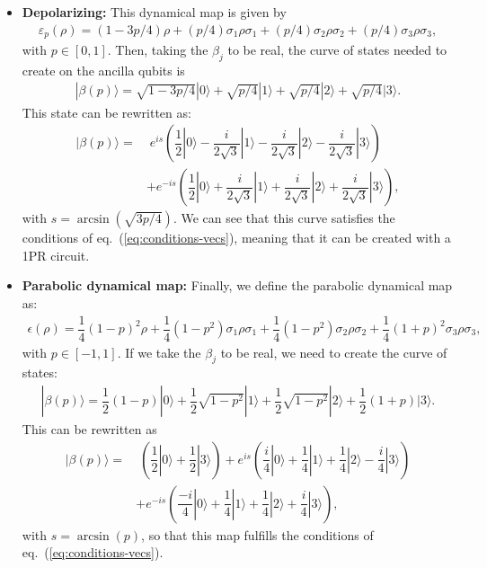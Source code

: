 \documentclass[10pt,letterpaper]{article} %
\newcommand{\eref}[1]{eq.~(\ref{#1})}
\begin{document}
\begin{itemize}
\item \textbf{Depolarizing:} This dynamical map is given by
\begin{align*}
\varepsilon_p(\rho) = (1-3p/4) \rho + (p/4) \sigma_1 \rho \sigma_1 + (p/4) \sigma_2 \rho \sigma_2 + (p/4) \sigma_3 \rho \sigma_3,
\end{align*}
with $p \in [0,1]$. 
Then, taking the $\beta_j$ to be real,
the curve of states needed to create on the ancilla qubits is
\begin{align*}
|\beta(p) \rangle = \sqrt{1-3p/4} |0\rangle + \sqrt{p/4} |1\rangle + \sqrt{p/4} |2 \rangle  + \sqrt{p/4} |3\rangle.
\end{align*}
This state can be rewritten as:
\begin{align*}
|\beta(p)\rangle =& \; e^{is} \left( \dfrac{1}{2} |0\rangle - \dfrac{i}{2\sqrt{3}} |1\rangle - \dfrac{i}{2\sqrt{3}} |2 \rangle - \dfrac{i}{2\sqrt{3}} |3\rangle \right) \\
& + e^{-is} \left( \dfrac{1}{2} |0\rangle + \dfrac{i}{2\sqrt{3}} |1\rangle + \dfrac{i}{2\sqrt{3}} |2\rangle + \dfrac{i}{2\sqrt{3}} |3 \rangle \right),
\end{align*}
with $s = \arcsin(\sqrt{3p/4})$.
We can see that this curve satisfies the conditions of \eref{eq:conditions-vecs}, meaning that it can be created with a 
1PR circuit.

\item \textbf{Parabolic dynamical map:} Finally, we define the parabolic dynamical map as:
\begin{eqnarray}
\epsilon(\rho) = \dfrac{1}{4} (1-p)^2  \rho + \dfrac{1}{4} (1-p^2) \sigma_1 \rho \sigma_1 + \dfrac{1}{4} (1-p^2) \sigma_2 \rho \sigma_2 + \dfrac{1}{4} (1+p)^2 \sigma_3 \rho \sigma_3 ,
\end{eqnarray}
with $p \in [-1,1]$. 
If we take the $\beta_j$ to be real,
we need to create the curve of states:
\begin{eqnarray}
|\beta(p)\rangle = \dfrac{1}{2} (1-p) |0\rangle + \dfrac{1}{2} \sqrt{1-p^2} |1\rangle +  \dfrac{1}{2} \sqrt{1-p^2} |2\rangle +  \dfrac{1}{2}(1+p) |3\rangle.
\end{eqnarray}
This can be rewritten as
\begin{align*}
|\beta(p)\rangle =&\; \left( \dfrac{1}{2}|0\rangle + \dfrac{1}{2} |3\rangle \right) + e^{is} \left( \dfrac{i}{4}|0\rangle + \dfrac{1}{4} |1\rangle + \dfrac{1}{4} |2\rangle - \dfrac{i}{4} |3\rangle \right) \\
& + e^{-is}  \left( \dfrac{-i}{4} |0\rangle + \dfrac{1}{4} |1\rangle + \dfrac{1}{4} |2\rangle + \dfrac{i}{4} |3\rangle \right),
\end{align*}
with $s = \arcsin(p)$, so that
this map fulfills the conditions of  \eref{eq:conditions-vecs}.
\end{itemize}
\end{document}
